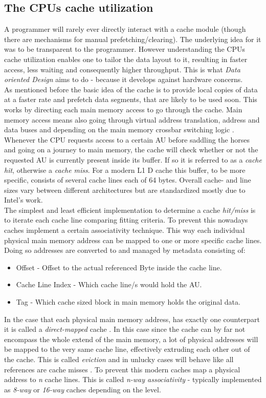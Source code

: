 \subsection{The CPUs cache utilization}\label{cpucu}
A programmer will rarely ever directly interact with a cache module (though there are mechanisms for manual prefetching/clearing). The underlying idea for it was to be transparent to the programmer. However understanding the CPUs cache utilization enables one to tailor the data layout to it, resulting in faster access, less waiting and consequently higher throughput. This is what \textit{Data oriented Design} aims to do - because it develops against hardware concerns.\\
As mentioned before the basic idea of the cache is to provide local copies of data at a faster rate and prefetch data segments, that are likely to be used soon. This works by directing each main memory access to go through the cache. Main memory access means also going through virtual address translation, address and data buses and depending on the main memory crossbar switching logic .  
Whenever the CPU requests access to a certain AU before saddling the horses and going on a journey to main memory, the cache will check whether or not the requested AU is currently present inside its buffer. If so it is referred to as a \textit{cache hit}, otherwise a \textit{cache miss}. For a modern L1 D cache this buffer, to be more specific, consists of several cache lines each of 64 bytes. Overall cache- and line sizes vary between different architectures but are standardized mostly due to Intel's work.\\
The simplest and least efficient implementation to determine a cache \textit{hit/miss} is to iterate each cache line comparing fitting criteria. To prevent this nowadays caches implement a certain associativity technique. This way each individual physical main memory address can be mapped to one or more specific cache lines. Doing so addresses are converted to and managed by metadata  consisting of: 
\begin{itemize}
	\item Offset - Offset to the actual referenced Byte inside the cache line.
	\item Cache Line Index - Which cache line/s would hold the AU.
	\item Tag - Which cache sized block in main memory holds the original data.
\end{itemize}
In the case that each physical main memory address, has exactly one counterpart it is called a \textit{direct-mapped} cache . In this case since the cache can by far not encompass the whole extend of the main memory, a lot of physical addresses will be mapped to the very same cache line, effectively extruding each other out of the cache. This is called \textit{eviction} and in unlucky cases will behave like all references are cache misses . To prevent this modern caches map a physical address to \textit{n} cache lines. This is called \textit{n-way associativity} - typically implemented as \textit{8-way} or \textit{16-way} caches depending on the level.\\
